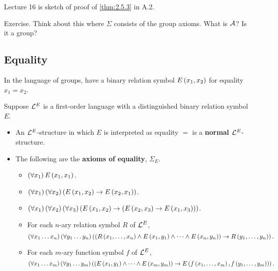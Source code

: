 
Lecture 16 is sketch of proof of \ref{thm:2.5.3} in A.2.

\begin{example2}
Exercise. Think about this where $ \Sigma $ consists of the group axioms. What is $ \AA $? Is it a group?
\end{example2}


\subsection{Equality}

\begin{example2}
In the language of groups, have a binary relation symbol $ E\rb{x_1, x_2} $ for equality $ x_1 = x_2 $.
\end{example2}

\begin{definition}
Suppose $ \LL^E $ is a first-order language with a distinguished binary relation symbol $ E $.
\begin{itemize}
\item An $ \LL^E $-structure in which $ E $ is interpreted as equality $ = $ is a \textbf{normal} $ \LL^E $-structure.
\item The following are the \textbf{axioms of equality}, $ \Sigma_E $.
\begin{itemize}
\item $ \fab{x_1}E\rb{x_1, x_1} $.
\item $ \fab{x_1}\fab{x_2}\impb{E\rb{x_1, x_2}}{E\rb{x_2, x_1}} $.
\item $ \fab{x_1}\fab{x_2}\fab{x_3}\impb{E\rb{x_1, x_2}}{\impb{E\rb{x_2, x_3}}{E\rb{x_1, x_3}}} $.
\item For each $ n $-ary relation symbol $ R $ of $ \LL^E $,
$$ \fab{x_1 \dots x_n}\fab{y_1 \dots y_n}\impb{\rb{R\rb{x_1, \dots, x_n} \land E\rb{x_1, y_1} \land \dots \land E\rb{x_n, y_n}}}{R\rb{y_1, \dots, y_n}}. $$
\item For each $ m $-ary function symbol $ f $ of $ \LL^E $,
$$ \fab{x_1 \dots x_m}\fab{y_1 \dots y_m}\impb{\rb{E\rb{x_1, y_1} \land \dots \land E\rb{x_m, y_m}}}{E\rb{f\rb{x_1, \dots, x_m}, f\rb{y_1, \dots, y_m}}}. $$
\end{itemize}
\end{itemize}
\end{definition}

\pagebreak

